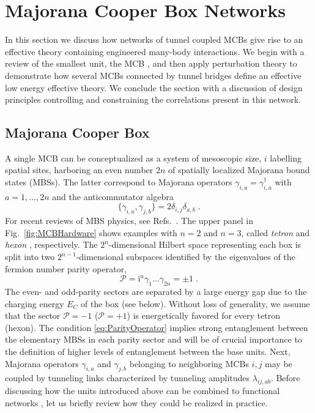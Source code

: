 \documentclass[twocolumn,floats,prx,showpacs]{revtex4-1}
\begin{document}
\section{Majorana Cooper Box Networks}\label{sec2}

In this section we discuss how networks of tunnel coupled MCBs give rise to an effective  theory containing engineered many-body interactions. We begin with a review of the smallest unit, the MCB  \cite{Beri2012,Beri2013,Altland2013,Plugge2017,Karzig2017}, and then apply perturbation theory to demonstrate how several MCBs connected by tunnel bridges define an effective low energy effective theory. We conclude the section with a discussion of design principles controlling and constraining the correlations present in this network.

\subsection{Majorana Cooper Box}\label{sec2a}

A single MCB can be conceptualized as a system of mesoscopic size, $i$ labelling spatial sites, 
harboring an even number $2n$ of spatially localized Majorana bound states (MBSs). The latter correspond to 
Majorana operators $\gamma_{i,a}=\gamma^\dagger_{i,a}$ with $a=1,\dots,2n$ and  the anticommutator algebra 
\begin{equation}
\{ \gamma_{i,a},\gamma_{j,b}\}=2\delta_{i,j}\delta_{a,b}\; . 
\end{equation}
For recent reviews of MBS physics, see Refs.~\cite{Alicea2012,Leijnse2012,Beenakker2013,Sarma2015,Aguado2017,Lutchyn2018}.  
The upper panel in Fig.~\ref{fig:MCBHardware} shows examples with $n=2$ and $n=3$, called \emph{tetron} and \emph{hexon} \cite{Karzig2017}, respectively.   The $2^n$-dimensional Hilbert space representing each box is split into two $2^{n-1}$-dimensional subspaces identified by the eigenvalues of the fermion number parity operator,
\begin{equation}
\label{eq:ParityOperator}
\mathcal P =  \mathrm i ^n\gamma_1 \ldots \gamma_{2n}=\pm 1\;.
\end{equation}
The even- and odd-parity sectors are separated by a large energy gap due to the charging energy $E_C$ of the box (see below).  Without loss of generality, we assume that the sector $\mathcal{P}=-1$ ($\mathcal P=+1$) is energetically favored for every tetron (hexon). The condition \eqref{eq:ParityOperator} implies strong entanglement between the elementary MBSs in each parity sector and will be of crucial importance to the definition of higher levels of entanglement between the base units. Next, Majorana operators $\gamma_{i,a}$ and $\gamma_{j,b}$ belonging to neighboring MCBs $i,j$ may be coupled by tunneling links characterized by tunneling amplitudes $\lambda_{ij,ab}$. 
Before discussing how the units introduced above can be combined to functional networks   \cite{PhysRevB.94.174514,Xu2010,PhysRevLett.108.260504,Roy2017,Nussinov2012,Vijay2015,Vijay2016,Litinski2017}, 
let us briefly review how they could be realized in practice.
\end{document}
